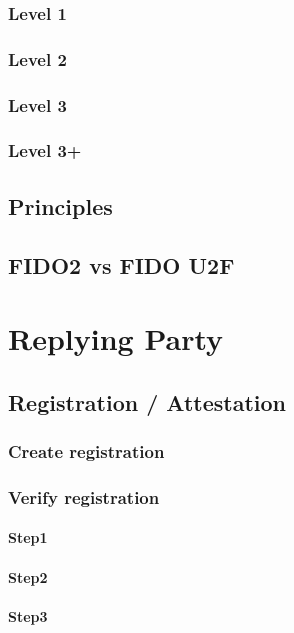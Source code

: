 \documentclass[a4paper, 11pt]{scrartcl}
\begin{document}
\subsubsection{Level 1}
\subsubsection{Level 2}
\subsubsection{Level 3}
\subsubsection{Level 3+}

\subsection{Principles}

\subsection{FIDO2 vs FIDO U2F}

\section{Replying Party}
\label{sec:replying_party}

\subsection{Registration / Attestation}

\subsubsection{Create registration}

\subsubsection{Verify registration}

\paragraph{Step1}
\paragraph{Step2}
\paragraph{Step3}
\end{document}
